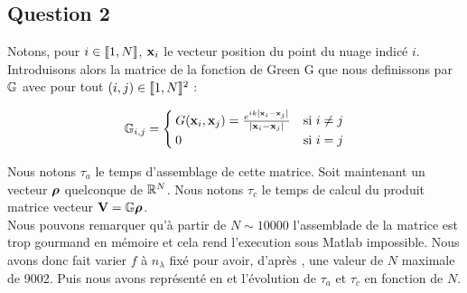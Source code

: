 \documentclass[10pt]{article}
\begin{document}
\begin{multicols}{2}
\vspace*{22pt}



\section*{Question 2}

Notons, pour $i \in  \llbracket 1,N \rrbracket $, ${\bf x}_i$ le vecteur position du point du nuage indicé $i$. Introduisons alors la matrice de la fonction de Green G que nous definissons par $\mathbb{G}$ avec pour tout $(i,j) \in  \llbracket 1,N \rrbracket ^{2}$ :

\begin{equation}
 \mathbb{G}_{i,j} =
 \begin{cases}
   G({\bf x}_i,{\bf x}_j) = \frac{e^{ik\left| {\bf x}_i - {\bf x}_j \right|}}{\left| {\bf x}_i - {\bf x}_j \right|} & \text{si } 
   i\neq j \\
   0 & \text{si } i=j
 \end{cases}
 \label{eq:green}
\end{equation}


Nous notons $\tau_{a}$ le temps d'assemblage de cette matrice. Soit maintenant un vecteur ${\boldsymbol{\rho}}$ quelconque de $\mathbb{R}^{N}$. Nous notons $\tau_c$ le temps de calcul du produit matrice vecteur ${\bf V} = \mathbb{G}{\boldsymbol{\rho}}$.\\

Nous pouvons remarquer qu'à partir de $N \sim 10 000$ l'assemblade de la matrice est trop gourmand en mémoire et cela rend l'execution sous Matlab impossible. Nous avons donc fait varier $f$ à $n_\lambda$ fixé pour avoir, d'après , une valeur de $N$ maximale de 9002. Puis nous avons représenté en  et  l'évolution de $\tau_a$ et $\tau_c$ en fonction de $N$.

\vspace*{-11pt}


\end{multicols}
\end{document}
